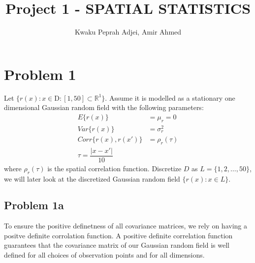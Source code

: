 \documentclass[]{article}
\title{Project 1 - SPATIAL STATISTICS}
\author{Kwaku Peprah Adjei, Amir Ahmed}
\date{}
\begin{document}
\maketitle

\newpage

\hypertarget{problem-1}{%
\section{Problem 1}\label{problem-1}}

Let
\(\lbrace r(x) : x \in \text{D} : \left[1, 50\right]\subset\mathbb{R}^1\rbrace\).
Assume it is modelled as a stationary one dimensional Gaussian random
field with the following parameters: \begin{equation}\label{prob1eq}
    \begin{split}
    E\lbrace r(x) \rbrace &= \mu_r = 0 \\
    Var\lbrace r(x)\rbrace &= \sigma_r^2 \\
    Corr\lbrace r(x), r(x')\rbrace &= \rho_r(\tau) \\
    \tau = \dfrac{|x-x'|}{10}
    \end{split}
\end{equation} where \(\rho_r(\tau)\) is the spatial correlation
function. Discretize \(D\) as \(L = \lbrace 1, 2, \dots, 50 \rbrace\),
we will later look at the discretized Gaussian random field
\(\lbrace r(x) : x\in L \rbrace\).

\hypertarget{problem-1a}{%
\subsection{Problem 1a}\label{problem-1a}}

To ensure the positive definetness of all covariance matrices, we rely
on having a positve definite corrolation function. A positive definite
correlation function guarantees that the covariance matrix of our
Gaussian random field is well defined for all choices of observation
points and for all dimensions.
\end{document}
